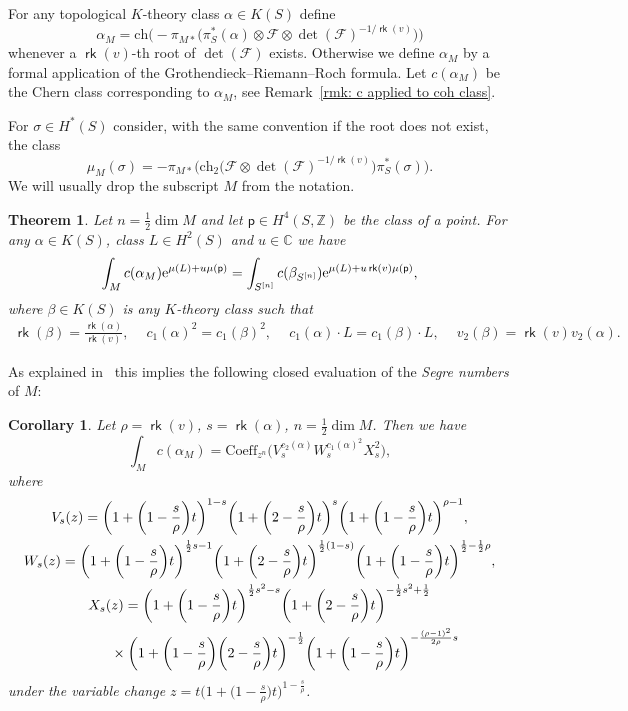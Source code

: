 \documentclass[pdftex]{sigma}
\numberwithin{equation}{section}
\newtheorem{thm}[Theorem]{Theorem}
\newtheorem{cor}[Theorem]{Corollary}
\newcommand{\BC}{{\mathbb{C}}}
\newcommand{\BZ}{{\mathbb{Z}}}
\newcommand{\CF}{{\mathcal F}}
\newcommand{\pt}{{\mathsf{p}}}
\newcommand{\ch}{{\mathrm{ch}}}
\newcommand{\1}{\mathsf{1}}
\newcommand\rk{\operatorname{\mathsf{rk}}}
\begin{document}
For any topological $K$-theory class $\alpha \in K(S)$ define
\[
\alpha_M = \ch\bigl(-\pi_{M \ast}\big(\pi_S^{\ast}(\alpha)\otimes\CF \otimes \det(\CF)^{-1/\rk(v)} \big)\bigr)
\]
whenever a $\rk(v)$-th root of $\det(\CF)$ exists.
Otherwise we define $\alpha_M$ by a formal application of the Grothendieck--Riemann--Roch formula.
Let $c(\alpha_M)$ be the Chern class corresponding to $\alpha_M$, see Remark~\ref{rmk: c applied to coh class}.

For $\sigma \in H^{\ast}(S)$ consider, with the same convention if the root does not exist, the class
\[
\mu_M(\sigma)=- \pi_{M \ast}\big(\ch_2\big(\CF \otimes \det(\CF)^{-1/\rk(v)}\big)\pi_S^{\ast}(\sigma)\big).
\]
We will usually drop the subscript $M$ from the notation.

\begin{thm} \label{thm:Intro}
Let $n = \frac{1}{2} \dim M$ and let $\pt \in H^4(S,\BZ)$ be the class of a point.
For any $\alpha \in K(S)$,
class $L \in H^2(S)$ and $u \in \BC$ we have
\begin{equation*}
\int_{M} c(\alpha_M) {\rm e}^{\mu(L) + u \mu(\pt)}
=\int_{S^{[n]}} c(\beta_{S^{[n]}}) {\rm e}^{\mu(L) + u \rk(v) \mu(\pt)},
\end{equation*}
where $\beta \in K(S)$ is any $K$-theory class such that
\begin{gather}
\rk(\beta) = \frac{\rk(\alpha)}{\rk(v)}, \quad\
c_1(\alpha)^2 = c_1(\beta)^2, \quad\
c_1(\alpha) \cdot L = c_1(\beta) \cdot L, \quad\
v_2(\beta) = \rk(v) v_2(\alpha).
\label{conditions on beta}
\end{gather}
\end{thm}

As explained in~\cite[Corollary~5.2]{GK} this implies the following closed evaluation
of the {\em Segre numbers} of $M$:

\begin{cor} \label{cor:Segre}
Let $\rho = \rk(v)$, $s = \rk(\alpha)$, $n=\frac{1}{2} \dim M$.
Then we have
\[
\int_{M} c(\alpha_M) = \mathrm{Coeff}_{z^n}\bigl(V_{s}^{c_2(\alpha)} W_{s}^{c_1(\alpha)^2} X_{s}^{2}  \bigr),
\]
where
\begin{gather*}
V_s(z) = \bigg(1+\bigg(1-\frac{s}{\rho}\bigg)t\bigg)^{1-s} \bigg(1+\bigg(2-\frac{s}{\rho}\bigg)t\bigg)^s \bigg(1+\bigg(1-\frac{s}{\rho}\bigg)t\bigg)^{\rho-1},
\\
W_s(z) = \bigg(1+\bigg(1-\frac{s}{\rho}\bigg)t\bigg)^{\frac{1}{2}s-1} \bigg(1+\bigg(2-\frac{s}{\rho}\bigg)t\bigg)^{\frac{1}{2}(1-s)} \bigg(1+\bigg(1-\frac{s}{\rho}\bigg)t\bigg)^{\frac{1}{2} - \frac{1}{2} \rho},
\\
X_s(z) =  \bigg(1+\bigg(1-\frac{s}{\rho}\bigg)t\bigg)^{\frac{1}{2} s^2-s} \bigg(1+\bigg(2-\frac{s}{\rho}\bigg)t\bigg)^{-\frac{1}{2}s^2+\frac{1}{2}}
\\ \hphantom{X_s(z) =}
{}\times \bigg(1+\bigg(1-\frac{s}{\rho}\bigg)\bigg(2-\frac{s}{\rho}\bigg)t\bigg)^{-\frac{1}{2}} \bigg(1+\bigg(1-\frac{s}{\rho}\bigg)t\bigg)^{-\frac{(\rho-1)^2}{2\rho} s}
\end{gather*}
under the variable change $z = t \big(1+\big(1-\tfrac{s}{\rho}\big) t\big)^{1-\frac{s}{\rho}}$.
\end{cor}
\end{document}
